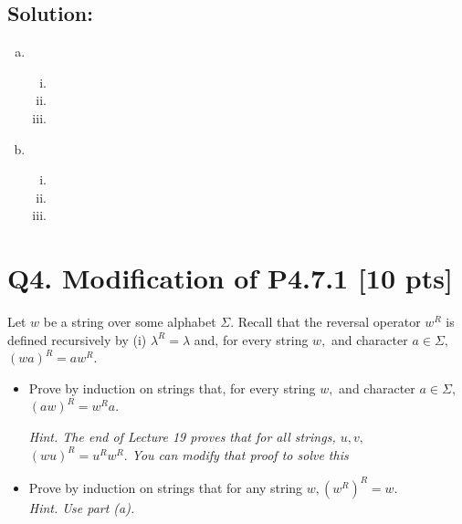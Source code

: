 \documentclass[12pt]{article}
\begin{document}
\subsection*{\textbf{Solution:}}
\begin{enumerate}[(a)]
    \item \ 
        \begin{enumerate}[(i)]
            \item 
            \item 
            \item 
        \end{enumerate}
    \item \ 
        \begin{enumerate}[(i)]
            \item 
            \item 
            \item 
        \end{enumerate}
\end{enumerate}


\newpage

\section*{\textbf{Q4.  Modification of P4.7.1} [10 pts]}
Let $w$ be  a string over some alphabet $\Sigma.$ Recall that the reversal operator  $w^R$ is defined recursively by (i) $\lambda^R = \lambda$ and, for every string $w,$ and character $a\in \Sigma,$ $(wa)^R = a w^R.$


\begin{itemize}
\item[(a)] Prove by induction on strings that, for every string $w,$ and character $a\in \Sigma,$ $(a w)^R = w^R a.$ 

{\em \small Hint. The end of Lecture 19 proves that for all {\em strings}, $u,v,$  
$(wu)^R = u^R w^R.$ You can modify that proof to solve this}

\item[(b)]  Prove by induction on strings that for any string $w, (w^R)^R = w$.\\
{\em \small Hint. Use part (a).
}

\end{itemize}
\end{document}
